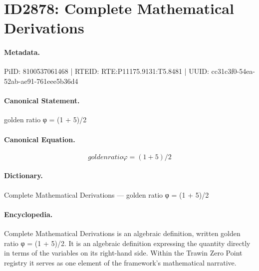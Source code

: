 \section*{ID2878: Complete Mathematical Derivations}
\paragraph{Metadata.}
PiID: 8100537061468 | RTEID: RTE:P11175.9131:T5.8481 | UUID: cc31c3f0-54ea-52ab-ae91-761eee5b36d4

\paragraph{Canonical Statement.}
golden ratio φ = (1 + 5)/2

\paragraph{Canonical Equation.}
\[
golden ratio φ = (1 + 5)/2
\]

\paragraph{Dictionary.}
Complete Mathematical Derivations — golden ratio φ = (1 + 5)/2

\paragraph{Encyclopedia.}
Complete Mathematical Derivations is an algebraic definition, written golden ratio φ = (1 + 5)/2. It is an algebraic definition expressing the quantity directly in terms of the variables on its right-hand side. Within the Trawin Zero Point registry it serves as one element of the framework's mathematical narrative.
